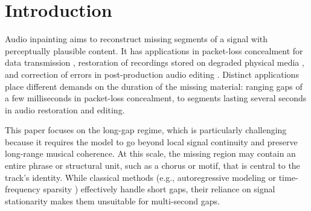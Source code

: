 \documentclass{article}
\begin{document}
\vspace{-3pt}
\section{Introduction}\label{sec:introduction}
\vspace{-2pt}



Audio inpainting \cite{adler_audio_2012} aims to reconstruct missing segments of a signal with perceptually plausible content.
It has applications in packet-loss concealment for data transmission \cite{sanneck_new_1996}, restoration of recordings stored on degraded physical media \cite{moliner_diffusion-based_2024}, and correction of errors in post-production audio editing \cite{levy_controllable_2023}.
Distinct applications place different demands on the duration of the missing material: ranging gaps of a few milliseconds in packet-loss concealment, to segments lasting several seconds in audio restoration and editing.

This paper focuses on the long-gap regime, which is particularly challenging because it requires the model to go beyond local signal continuity and preserve long-range musical coherence.
At this scale, the missing region may contain an entire phrase or structural unit, such as a chorus or motif, that is central to the track's identity.
While classical methods (e.g., autoregressive modeling 
\cite{janssen_adaptive_1986,kauppinen_audio_2002,esquef_interpolation_2003} 
or time-frequency sparsity
\cite{mokry_introducing_2019, taubock2020dictionary}) effectively handle short gaps, their reliance on signal stationarity makes them unsuitable for multi-second gaps.





\end{document}
